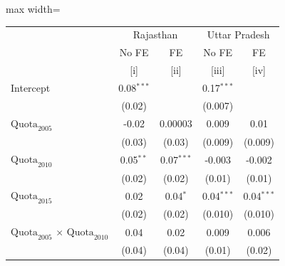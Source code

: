 
\begingroup
\centering
\scriptsize
\begin{adjustbox}{max width=\linewidth}
   \begin{threeparttable}[b]
      \begin{tabular}{lcccc}
         \toprule
          & \multicolumn{2}{c}{Rajasthan} & \multicolumn{2}{c}{Uttar Pradesh} \\ 
                                                                                                  & No FE        & FE            & No FE        & FE \\   
                                                                                                  & [i]          & [ii]          & [iii]        & [iv]\\  
         \midrule 
         Intercept                                                                                & 0.08$^{***}$ &               & 0.17$^{***}$ &   \\   
                                                                                                  & (0.02)       &               & (0.007)      &   \\   
         $\text{Quota}_{2005}$                                                                    & -0.02        & 0.00003       & 0.009        & 0.01\\   
                                                                                                  & (0.03)       & (0.03)        & (0.009)      & (0.009)\\   
         $\text{Quota}_{2010}$                                                                    & 0.05$^{**}$  & 0.07$^{***}$  & -0.003       & -0.002\\   
                                                                                                  & (0.02)       & (0.02)        & (0.01)       & (0.01)\\   
         $\text{Quota}_{2015}$                                                                    & 0.02         & 0.04$^{*}$    & 0.04$^{***}$ & 0.04$^{***}$\\   
                                                                                                  & (0.02)       & (0.02)        & (0.010)      & (0.010)\\   
         $\text{Quota}_{2005}$ $\times$ $\text{Quota}_{2010}$                                     & 0.04         & 0.02          & 0.009        & 0.006\\   
                                                                                                  & (0.04)       & (0.04)        & (0.01)       & (0.02)\\   

\end{tabular}
\end{threeparttable}
\end{adjustbox}
